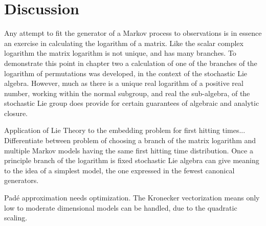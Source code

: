 \section{Discussion}
Any attempt to fit the generator of a Markov process to observations is in essence an 
exercise in calculating the logarithm of a matrix. Like the scalar complex logarithm the
matrix logarithm is not unique, and has many branches. To demonstrate this point in chapter
two a calculation of one of the branches of the logarithm of permutations was developed, in
the context of the stochastic Lie algebra. However, much as there is a unique real logarithm
of a positive real number, working within the normal subgroup, and real the sub-algebra, of
the stochastic Lie group does provide for certain guarantees of algebraic and analytic
closure.


Application of Lie Theory to the embedding problem for first hitting times...
Differentiate between problem of choosing a branch of the matrix logarithm
and multiple Markov models having the same first hitting time distribution.
Once a principle branch of the logarithm is fixed stochastic Lie algebra can 
give meaning to the idea of a simplest model, the one expressed in the fewest 
canonical generators.

Pad\'{e} approximation needs optimization. The Kronecker vectorization means 
only low to moderate dimensional models can be handled, due to the quadratic
scaling.